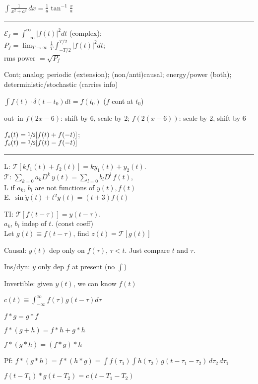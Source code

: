 \documentclass[4pt]{article}
\theoremstyle{definition}
\theoremstyle{definition}
\newcommand{\ra}{\rightarrow}
\begin{document}
\begin{multicols}{3}
    \(\int \frac{1} {x^2+a^2}\, dx = \frac{1}{a} \tan^{-1} \frac x a\)
    \rule{\linewidth}{0.5pt}
    $\mathcal{E}_f = \int_{-\infty}^{\infty} |f(t)|^2 dt$ (complex); \\
    $P_f = \lim_{T\ra\infty}\frac{1}{T} \int^{T/2}_{-T/2} |f(t)|^2 dt $; \\
    rms power $= \sqrt {P_f}$

    Cont; 
    analog; 
    periodic (extension); 
    (non/anti)causal; 
    energy/power (both); 
    deterministic/stochastic (carries info)

    $\int f(t)\cdot \delta(t - t_0) dt = f(t_0)$ ($f$ cont at $t_0$)
    

    out--in  $f(2x-6)$: shift by 6, scale by 2; $f(2(x-6))$: scale by 2, shift by 6

    $f_e(t) = \sfrac{1}{2}[f(t) + f(-t)]$; \\
    $f_o(t) = \sfrac{1}{2}[f(t) - f(-t)]$
\rule{\linewidth}{0.5pt}
    L: $\mathcal{T}[kf_1(t) + f_2(t)] = ky_1(t) + y_2(t)$.\\
    $\mathcal{T}$: $\sum_{k=0}a_k D^k \, y(t) = \sum_{l=0}b_lD^l\, f(t)$,\\
    L if $a_k$, $b_l$ are not functions of $y(t), f(t)$\\
    E. $\sin\dot{y}(t) + t^2 y(t) = (t+3) f(t)$
    
    TI: $\mathcal{T}[f(t-\tau)] = y(t-\tau)$.\\
    $a_k$, $b_l$ indep of $t$. (const coeff)\\
    Let $g(t)\equiv f(t-\tau)$, find $z(t) = \mathcal{T}[g(t)]$


    Causal: $y(t)$ dep only on $f(\tau)$, $\tau < t$. 
    Just compare $t$ and $\tau$.
    
    Ins/dyn: $y$ only dep $f$ at present (no $\int$)
    
    Invertible: given $y(t)$, we can know $f(t)$

    $c(t) \equiv \int_{-\infty}^{\infty} f(\tau) g(t-\tau) d\tau$

    $f * g = g * f$
    
    $f * (g + h) = f * h + g * h$
    
    $f * (g * h) = (f * g) * h$

        Pf: $f * (g * h) = f * (h * g) = \int f(\tau_1) \int h(\tau_2)\, g(t - \tau_1 - \tau_2) \, d\tau_2 \, d\tau_1$
    
     $f(t - T_1) * g(t - T_2) = c(t - T_1 - T_2)$


\end{multicols}
\end{document}
